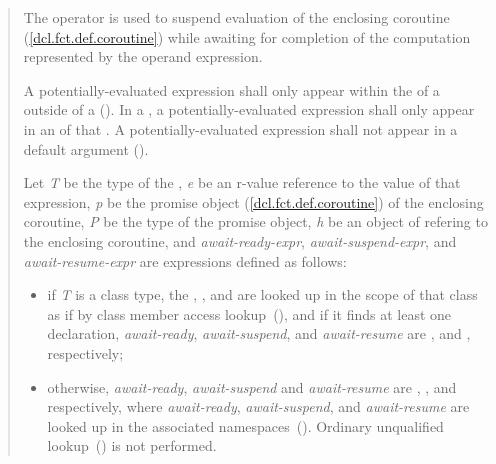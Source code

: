 \begin{quote}
\pnum
The  operator is used to suspend evaluation of the enclosing coroutine (\ref{dcl.fct.def.coroutine}) while awaiting
for completion of the computation represented by the operand expression.

\pnum
A potentially-evaluated 
 expression shall only appear within the  of a  outside of a  ().
In a , a potentially-evaluated  expression shall only appear in an  of that .
A potentially-evaluated  expression shall not appear in a default argument ().

\pnum
Let \textit{T} be the type of the ,
\textit{e} be an r-value reference to the value of that expression,  \textit{p} be the promise object (\ref{dcl.fct.def.coroutine})
of the enclosing coroutine, \textit{P} be the type of the promise object, \textit{h} be an object of  refering to the enclosing coroutine, and \textit{await-ready-expr}, \textit{await-suspend-expr}, and \textit{await-resume-expr} are expressions defined as follows:
\begin{itemize}
  \item if \textit{T}  is a class type, the 
  , , and  are 
  looked up in the scope of that class
  as if by class member access lookup~(), and if it finds at least one declaration, 
  \textit{await-ready}, \textit{await-suspend}, and \textit{await-resume} are
  ,  and ,
  respectively;
  
  \item otherwise, \textit{await-ready}, \textit{await-suspend} and \textit{await-resume} are 
  , 
  , and  
  respectively, where 
  \textit{await-ready}, \textit{await-suspend}, and \textit{await-resume} are 
  looked up in the associated namespaces~().
  \enternote Ordinary unqualified lookup~() is not
  performed. \exitnote
\end{itemize}


\end{quote}
